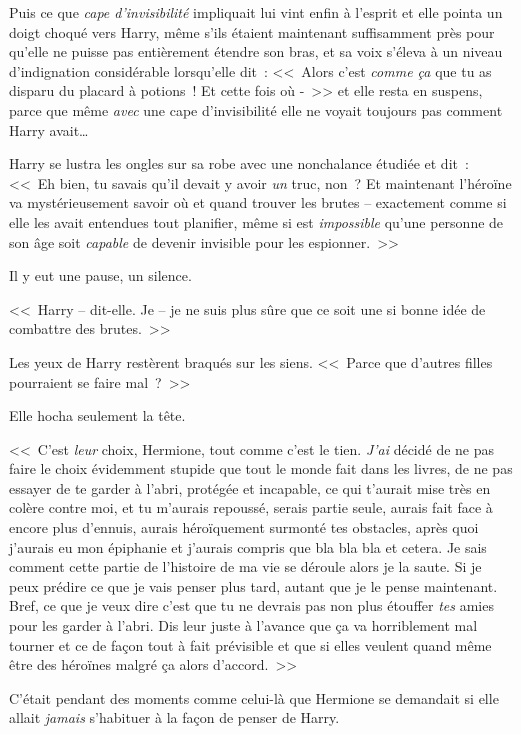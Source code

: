 Puis ce que \emph{cape d'invisibilité} impliquait lui vint enfin à l'esprit et elle pointa un doigt choqué vers Harry, même s'ils étaient maintenant suffisamment près pour qu'elle ne puisse pas entièrement étendre son bras, et sa voix s'éleva à un niveau d'indignation considérable lorsqu'elle dit~: <<~Alors c'est \emph{comme ça} que tu as disparu du placard à potions~! Et cette fois où -~>> et elle resta en suspens, parce que même \emph{avec} une cape d'invisibilité elle ne voyait toujours pas comment Harry avait…

Harry se lustra les ongles sur sa robe avec une nonchalance étudiée et dit~: <<~Eh bien, tu savais qu'il devait y avoir \emph{un} truc, non~? Et maintenant l'héroïne va mystérieusement savoir où et quand trouver les brutes -- exactement comme si elle les avait entendues tout planifier, même si est \emph{impossible} qu'une personne de son âge soit \emph{capable} de devenir invisible pour les espionner.~>>

Il y eut une pause, un silence.

<<~Harry -- dit-elle. Je -- je ne suis plus sûre que ce soit une si bonne idée de combattre des brutes.~>>

Les yeux de Harry restèrent braqués sur les siens. <<~Parce que d'autres filles pourraient se faire mal~?~>>

Elle hocha seulement la tête.

<<~C'est \emph{leur} choix, Hermione, tout comme c'est le tien. \emph{J'ai} décidé de ne pas faire le choix évidemment stupide que tout le monde fait dans les livres, de ne pas essayer de te garder à l'abri, protégée et incapable, ce qui t'aurait mise très en colère contre moi, et tu m'aurais repoussé, serais partie seule, aurais fait face à encore plus d'ennuis, aurais héroïquement surmonté tes obstacles, après quoi j'aurais eu mon épiphanie et j'aurais compris que bla bla bla et cetera. Je sais comment cette partie de l'histoire de ma vie se déroule alors je la saute. Si je peux prédire ce que je vais penser plus tard, autant que je le pense maintenant. Bref, ce que je veux dire c'est que tu ne devrais pas non plus étouffer \emph{tes} amies pour les garder à l'abri. Dis leur juste à l'avance que ça va horriblement mal tourner et ce de façon tout à fait prévisible et que si elles veulent quand même être des héroïnes malgré ça alors d'accord.~>>

C'était pendant des moments comme celui-là que Hermione se demandait si elle allait \emph{jamais} s'habituer à la façon de penser de Harry.

